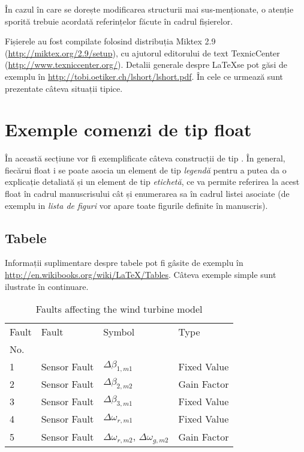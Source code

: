 \begin{rem}
\label{rem:at}
În cazul în care se dorește modificarea structurii mai sus-menționate, o atenție sporită trebuie acordată referințelor făcute în cadrul fișierelor. \eor
\end{rem}

Fișierele au fost compilate folosind distribuția Miktex 2.9 (\url{http://miktex.org/2.9/setup}), cu ajutorul editorului de text TexnicCenter (\url{http://www.texniccenter.org/}). Detalii generale despre \LaTeX se pot găsi de exemplu în \url{http://tobi.oetiker.ch/lshort/lshort.pdf}. În cele ce urmează sunt prezentate câteva situații tipice.


\section{Exemple comenzi de tip float}
În această secțiune  vor fi exemplificate câteva construcții de tip . În general, fiecărui float i se poate asocia un element de tip \emph{legendă} pentru a putea da o explicație detaliată și un element de tip \emph{etichetă}, ce va permite referirea la acest float în cadrul manuscrisului cât și enumerarea sa în cadrul listei asociate (de exemplu in \emph{lista de figuri} vor apare toate figurile definite în manuscris).

\subsection{Tabele}
Informații suplimentare despre tabele pot fi gâsite de exemplu în \url{http://en.wikibooks.org/wiki/LaTeX/Tables}.
Câteva exemple simple sunt ilustrate în continuare.

\begin{table}[ht!]
\begin{tabular}{llll}
\hline
Fault & Fault & Symbol & Type\\ 
No. & & & \\
\hline
1 & Sensor Fault & $\Delta\beta_{1,m1}$ & Fixed Value\\
2 & Sensor Fault & $\Delta\beta_{2,m2}$ & Gain Factor\\
3 & Sensor Fault & $\Delta\beta_{3,m1}$ & Fixed Value\\
4 & Sensor Fault & $\Delta\omega_{r,m1}$ & Fixed Value\\
5 & Sensor Fault & $\Delta\omega_{r,m2}$, $\Delta\omega_{g,m2}$ & Gain Factor\\ 
\hline
\end{tabular}
\centering
\caption{Faults affecting the wind turbine model}%
\label{tab:faults}
\end{table}


